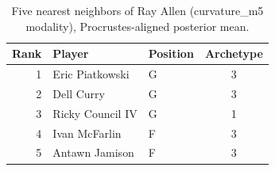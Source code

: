 \begin{table}[htbp]
  \centering\small
  \begin{tabular}{rllc}
    \toprule
    Rank & Player & Position & Archetype \\
    \midrule
    1 & Eric Piatkowski & G & 3 \\
    2 & Dell Curry & G & 3 \\
    3 & Ricky Council IV & G & 1 \\
    4 & Ivan McFarlin & F & 3 \\
    5 & Antawn Jamison & F & 3 \\
    \bottomrule
  \end{tabular}
  \caption{Five nearest neighbors of Ray Allen (curvature_m5 modality), Procrustes-aligned posterior mean.}
  \label{tab:Ray_Allen_neighbors_curvature_m5}
\end{table}


